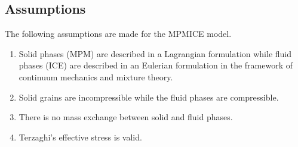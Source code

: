 \documentclass[preprint,12pt]{elsarticle}
\begin{document}
\subsection{\textsf{Assumptions}}
The following assumptions are made for the MPMICE model.
\begin{enumerate}
\item Solid phases (MPM) are described in a Lagrangian formulation while fluid phases (ICE) are described in an Eulerian formulation in the framework of continuum mechanics and mixture theory.
\item Solid grains are incompressible while the fluid phases are compressible.
\item There is no mass exchange between solid and fluid phases.
\item Terzaghi's effective stress is valid. 
\end {enumerate}
%
%
\end{document}
